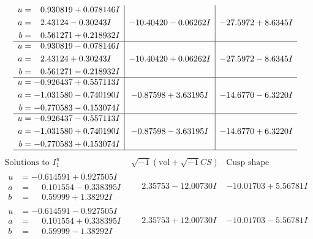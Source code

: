 \documentclass[1p]{elsarticle_modified}
\theoremstyle{definition}
\newcommand{\I}{\sqrt{-1}}
\begin{document}
$$\begin{array}{c|c|c}
\begin{aligned}
u &= \phantom{-}0.930819 + 0.078146 I \\
a &= \phantom{-}2.43124 - 0.30243 I \\
b &= \phantom{-}0.561271 + 0.218932 I\end{aligned}
 & -10.40420 - 0.06262 I & -27.5972 + 8.6345 I \\ \hline\begin{aligned}
u &= \phantom{-}0.930819 - 0.078146 I \\
a &= \phantom{-}2.43124 + 0.30243 I \\
b &= \phantom{-}0.561271 - 0.218932 I\end{aligned}
 & -10.40420 + 0.06262 I & -27.5972 - 8.6345 I \\ \hline\begin{aligned}
u &= -0.926437 + 0.557113 I \\
a &= -1.031580 - 0.740190 I \\
b &= -0.770583 - 0.153074 I\end{aligned}
 & -0.87598 + 3.63195 I & -14.6770 - 6.3220 I \\ \hline\begin{aligned}
u &= -0.926437 - 0.557113 I \\
a &= -1.031580 + 0.740190 I \\
b &= -0.770583 + 0.153074 I\end{aligned}
 & -0.87598 - 3.63195 I & -14.6770 + 6.3220 I\\
 \hline 
 \end{array}$$\newpage$$\begin{array}{c|c|c}  
\text{Solutions to }I^u_{1}& \I (\text{vol} + \sqrt{-1}CS) & \text{Cusp shape}\\
 \hline 
\begin{aligned}
u &= -0.614591 + 0.927505 I \\
a &= \phantom{-}0.101554 - 0.338395 I \\
b &= \phantom{-}0.59999 + 1.38292 I\end{aligned}
 & \phantom{-}2.35753 - 12.00730 I & -10.01703 + 5.56781 I \\ \hline\begin{aligned}
u &= -0.614591 - 0.927505 I \\
a &= \phantom{-}0.101554 + 0.338395 I \\
b &= \phantom{-}0.59999 - 1.38292 I\end{aligned}
 & \phantom{-}2.35753 + 12.00730 I & -10.01703 - 5.56781 I \\ \hline\begin{aligned}

\end{aligned}
\end{array}$$
\end{document}
